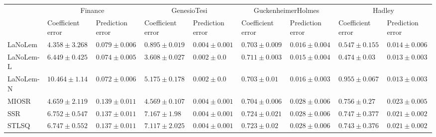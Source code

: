 \begin{table*}
{\begin{tabular}{lllllllll}
 & \multicolumn{2}{c}{Finance} & \multicolumn{2}{c}{GenesioTesi} & \multicolumn{2}{c}{GuckenheimerHolmes} & \multicolumn{2}{c}{Hadley} \\
 & Coefficient error & Prediction error & Coefficient error & Prediction error & Coefficient error & Prediction error & Coefficient error & Prediction error \\
\midrule
LaNoLem & $\mathbf{4.358}\pm 3.268$ & $0.079\pm 0.006$ & $\mathbf{0.895}\pm 0.019$ & $0.004\pm 0.001$ & $0.703\pm 0.009$ & $0.016\pm 0.004$ & $0.547\pm 0.155$ & $0.014\pm 0.006$ \\
LaNoLem-L & $6.449\pm 0.425$ & $0.074\pm 0.005$ & $3.608\pm 0.027$ & $0.002\pm 0.0$ & $0.711\pm 0.003$ & $\mathbf{0.015}\pm 0.004$ & $\mathbf{0.474}\pm 0.03$ & $0.013\pm 0.003$ \\
LaNoLem-N & $10.464\pm 1.14$ & $\mathbf{0.072}\pm 0.006$ & $5.175\pm 0.178$ & $\mathbf{0.002}\pm 0.0$ & $\mathbf{0.703}\pm 0.01$ & $0.016\pm 0.003$ & $0.955\pm 0.067$ & $\mathbf{0.013}\pm 0.003$ \\
MIOSR & $4.659\pm 2.119$ & $0.139\pm 0.011$ & $4.569\pm 0.107$ & $0.004\pm 0.001$ & $0.704\pm 0.006$ & $0.028\pm 0.006$ & $0.756\pm 0.27$ & $0.023\pm 0.005$ \\
SSR & $6.752\pm 0.547$ & $0.137\pm 0.011$ & $7.167\pm 1.98$ & $0.004\pm 0.001$ & $0.724\pm 0.021$ & $0.028\pm 0.006$ & $0.747\pm 0.377$ & $0.021\pm 0.002$ \\
STLSQ & $6.747\pm 0.552$ & $0.137\pm 0.011$ & $7.117\pm 2.025$ & $0.004\pm 0.001$ & $0.723\pm 0.02$ & $0.028\pm 0.006$ & $0.743\pm 0.376$ & $0.021\pm 0.002$ \\

\midrule


\end{tabular}}
\end{table*}

